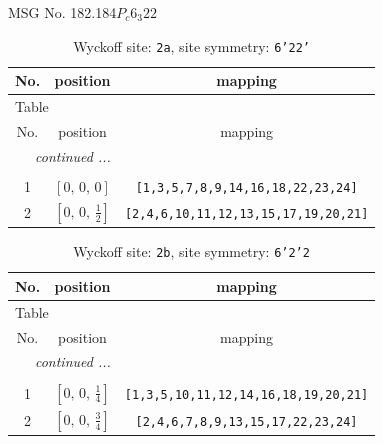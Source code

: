 \documentclass[fleqn,8pt]{jsarticle}
\begin{document}
\setcounter{MaxMatrixCols}{32}

\renewcommand{\tablename}{Table~}
\renewcommand{\figurename}{Figure~}
\begin{center}
\LARGE
MSG No. 182.184\quad$P_{c}6_{3}22$
\end{center}
\renewcommand{\arraystretch}{1.2}
\begin{longtable}{ccc}
\caption{Wyckoff site: {\tt 2a}, site symmetry: {\tt 6'22'}}
 \\
 \hline \hline
No. & position & mapping \\ \hline \endfirsthead

\multicolumn{2}{l}{\tablename\ \thetable{}} \\
 \hline \hline
No. & position & mapping \\ \hline \endhead

 \hline \hline
\multicolumn{2}{r}{\footnotesize\it continued ...} \\ \endfoot

 \hline \hline
\multicolumn{2}{r}{} \\ \endlastfoot

1 & $\left[ 0,\, 0,\, 0 \right]$ & {\tt [1,3,5,7,8,9,14,16,18,22,23,24]} \\ \hline
2 & $\left[ 0,\, 0,\, \frac{1}{2} \right]$ & {\tt [2,4,6,10,11,12,13,15,17,19,20,21]} \\
\end{longtable}
\renewcommand{\arraystretch}{1.2}
\begin{longtable}{ccc}
\caption{Wyckoff site: {\tt 2b}, site symmetry: {\tt 6'2'2}}
 \\
 \hline \hline
No. & position & mapping \\ \hline \endfirsthead

\multicolumn{2}{l}{\tablename\ \thetable{}} \\
 \hline \hline
No. & position & mapping \\ \hline \endhead

 \hline \hline
\multicolumn{2}{r}{\footnotesize\it continued ...} \\ \endfoot

 \hline \hline
\multicolumn{2}{r}{} \\ \endlastfoot

1 & $\left[ 0,\, 0,\, \frac{1}{4} \right]$ & {\tt [1,3,5,10,11,12,14,16,18,19,20,21]} \\ \hline
2 & $\left[ 0,\, 0,\, \frac{3}{4} \right]$ & {\tt [2,4,6,7,8,9,13,15,17,22,23,24]} \\
\end{longtable}
\end{document}
